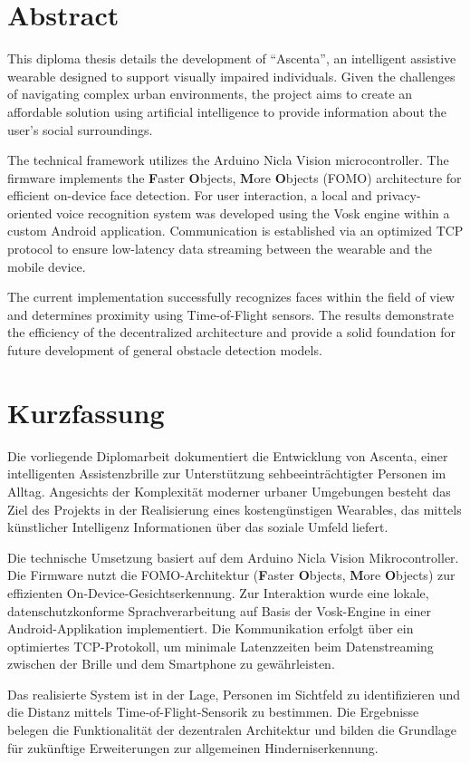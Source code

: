 \cleardoublepage
\chapter*{Abstract}

This diploma thesis details the development of ``Ascenta'', an intelligent assistive wearable designed to support visually impaired individuals. Given the challenges of navigating complex urban environments, the project aims to create an affordable solution using artificial intelligence to provide information about the user's social surroundings.

The technical framework utilizes the Arduino Nicla Vision microcontroller. The firmware implements the \textbf{F}aster \textbf{O}bjects, \textbf{M}ore \textbf{O}bjects (FOMO) architecture for efficient on-device face detection. For user interaction, a local and privacy-oriented voice recognition system was developed using the Vosk engine within a custom Android application. Communication is established via an optimized TCP protocol to ensure low-latency data streaming between the wearable and the mobile device.

The current implementation successfully recognizes faces within the field of view and determines proximity using Time-of-Flight sensors. The results demonstrate the efficiency of the decentralized architecture and provide a solid foundation for future development of general obstacle detection models.

\cleardoublepage
\chapter*{Kurzfassung}

Die vorliegende Diplomarbeit dokumentiert die Entwicklung von \glqq Ascenta\grqq, einer intelligenten Assistenzbrille zur Unterstützung sehbeeinträchtigter Personen im Alltag. Angesichts der Komplexität moderner urbaner Umgebungen besteht das Ziel des Projekts in der Realisierung eines kostengünstigen Wearables, das mittels künstlicher Intelligenz Informationen über das soziale Umfeld liefert.

Die technische Umsetzung basiert auf dem Arduino Nicla Vision Mikrocontroller. Die Firmware nutzt die FOMO-Architektur (\textbf{F}aster \textbf{O}bjects, \textbf{M}ore \textbf{O}bjects) zur effizienten On-Device-Gesichtserkennung. Zur Interaktion wurde eine lokale, datenschutzkonforme Sprachverarbeitung auf Basis der Vosk-Engine in einer Android-Applikation implementiert. Die Kommunikation erfolgt über ein optimiertes TCP-Protokoll, um minimale Latenzzeiten beim Datenstreaming zwischen der Brille und dem Smartphone zu gewährleisten.

Das realisierte System ist in der Lage, Personen im Sichtfeld zu identifizieren und die Distanz mittels Time-of-Flight-Sensorik zu bestimmen. Die Ergebnisse belegen die Funktionalität der dezentralen Architektur und bilden die Grundlage für zukünftige Erweiterungen zur allgemeinen Hinderniserkennung.